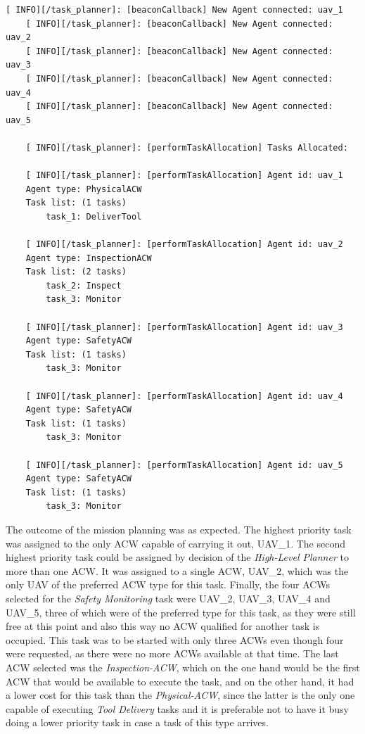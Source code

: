 \begin{lstlisting}[caption={Feedback messages printed after the connection of the \glspl{UAV} and the planning}, breaklines=true, label=exit:FirstAllocation]
    [ INFO][/task_planner]: [beaconCallback] New Agent connected: uav_1
    [ INFO][/task_planner]: [beaconCallback] New Agent connected: uav_2
    [ INFO][/task_planner]: [beaconCallback] New Agent connected: uav_3
    [ INFO][/task_planner]: [beaconCallback] New Agent connected: uav_4
    [ INFO][/task_planner]: [beaconCallback] New Agent connected: uav_5
    
    [ INFO][/task_planner]: [performTaskAllocation] Tasks Allocated:
    
    [ INFO][/task_planner]: [performTaskAllocation] Agent id: uav_1
    Agent type: PhysicalACW
    Task list: (1 tasks)
        task_1: DeliverTool
    
    [ INFO][/task_planner]: [performTaskAllocation] Agent id: uav_2
    Agent type: InspectionACW
    Task list: (2 tasks)
        task_2: Inspect
        task_3: Monitor
    
    [ INFO][/task_planner]: [performTaskAllocation] Agent id: uav_3
    Agent type: SafetyACW
    Task list: (1 tasks)
        task_3: Monitor
    
    [ INFO][/task_planner]: [performTaskAllocation] Agent id: uav_4
    Agent type: SafetyACW
    Task list: (1 tasks)
        task_3: Monitor
    
    [ INFO][/task_planner]: [performTaskAllocation] Agent id: uav_5
    Agent type: SafetyACW
    Task list: (1 tasks)
        task_3: Monitor
\end{lstlisting}

The outcome of the mission planning was as expected. The highest priority task was assigned to the only \gls{ACW} capable of carrying it out, UAV\_1. The second highest priority task could be assigned by decision of the \emph{High-Level Planner} to more than one \gls{ACW}. It was assigned to a single \gls{ACW}, UAV\_2, which was the only \gls{UAV} of the preferred \gls{ACW} type for this task. Finally, the four \glspl{ACW} selected for the \emph{Safety Monitoring} task were UAV\_2, UAV\_3, UAV\_4 and UAV\_5, three of which were of the preferred type for this task, as they were still free at this point and also this way no \gls{ACW} qualified for another task is occupied. This task was to be started with only three \glspl{ACW} even though four were requested, as there were no more \glspl{ACW} available at that time. The last \gls{ACW} selected was the \emph{Inspection-ACW}, which on the one hand would be the first \gls{ACW} that would be available to execute the task, and on the other hand, it had a lower cost for this task than the \emph{Physical-ACW}, since the latter is the only one capable of executing \emph{Tool Delivery} tasks and it is preferable not to have it busy doing a lower priority task in case a task of this type arrives.

